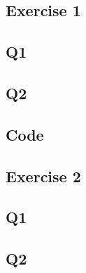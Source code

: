 \begin{appendices}
\chapter{Exercise 1}
\section{Q1}

\section{Q2}

\section{Code}

\end{appendices}
\begin{appendices}
\chapter{Exercise 2}
\section{Q1}
\section{Q2}
\end{appendices}